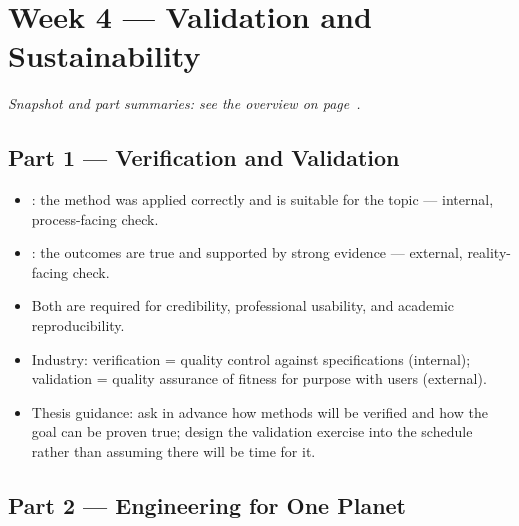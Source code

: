 \documentclass[../main.tex]{subfiles}
\begin{document}
\setlength{\parskip}{3pt}

\chapter{Week 4 — Validation and Sustainability}
\label{ch:week4}

\textit{Snapshot and part summaries: see the overview on page~\pageref{ov:week4}.}

\section{Part 1 — Verification and Validation}
\label{sec:vv}

\begin{itemize}
  \item {}: the method was applied correctly and is suitable for the topic — internal, process-facing check.
  \item {}: the outcomes are true and supported by strong evidence — external, reality-facing check.
  \item Both are required for credibility, professional usability, and academic reproducibility.
  \item Industry: verification = quality control against specifications (internal); validation = quality assurance of fitness for purpose with users (external).
  \item Thesis guidance: ask in advance how methods will be verified and how the goal can be proven true; design the validation exercise into the schedule rather than assuming there will be time for it.
\end{itemize}

\section{Part 2 — Engineering for One Planet}
\label{sec:eop}
\end{document}

